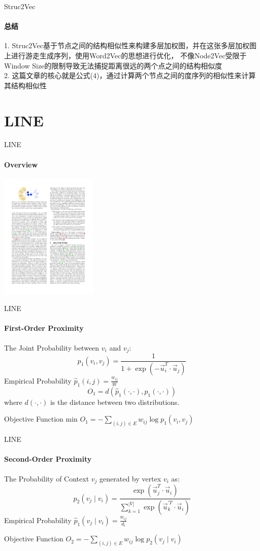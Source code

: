 \documentclass{beamer}
\begin{document}
\begin{frame}{Struc2Vec}
    \framesubtitle{总结}
    1. Struc2Vec基于节点之间的结构相似性来构建多层加权图，并在这张多层加权图上进行游走生成序列，使用Word2Vec的思想进行优化，
    不像Node2Vec受限于Window Size的限制导致无法捕捉距离很远的两个点之间的结构相似度\\
    2. 这篇文章的核心就是公式(4)，通过计算两个节点之间的度序列的相似性来计算其结构相似性
\end{frame}
\section{LINE}
\begin{frame}{LINE}
    \framesubtitle{Overview}
    \centering\includegraphics[height=6cm]{line.pdf}
\end{frame}
\begin{frame}{LINE}
    \framesubtitle{First-Order Proximity}
    The Joint Probability between $v_i$ and $v_j$:
    $$p_{1}\left(v_{i}, v_{j}\right)=\frac{1}{1+\exp \left(-\vec{u}_{i}^{T} \cdot \vec{u}_{j}\right)}$$ 
    Empirical Probability $\hat{p}_1(i, j)=\frac{w_{ij}}{W}$
    $$O_{1}=d\left(\hat{p}_{1}(\cdot, \cdot), p_{1}(\cdot, \cdot)\right)$$ 
    where $d(·, ·)$ is the distance between two distributions.
    \begin{block}{Objective Function}
        min $O_{1}=-\sum_{(i, j) \in E} w_{i j} \log p_{1}\left(v_{i}, v_{j}\right)$
    \end{block}
\end{frame}
\begin{frame}{LINE}
    \framesubtitle{Second-Order Proximity}
    The Probability of Context $v_j$ generated by vertex $v_i$ as:
    $$
    p_{2}\left(v_{j} \mid v_{i}\right)=\frac{\exp \left(\vec{u}_{j}^{T} \cdot \vec{u}_{i}\right)}{\sum_{k=1}^{|V|} \exp \left(\vec{u}_{k}^{\prime T} \cdot \vec{u}_{i}\right)}
    $$
    Empirical Probability $\hat{p}_1(v_j \mid v_i)=\frac{w_{ij}}{d_i}$
    \begin{block}{Objective Function}
        $O_{2}=-\sum_{(i, j) \in E} w_{i j} \log p_{2}\left(v_{j} \mid v_{i}\right)$
    \end{block}
\end{frame}
\end{document}
